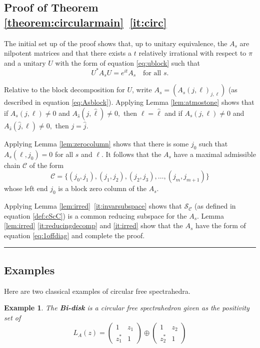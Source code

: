 \documentclass[12pt,makeidx]{amsart}
\renewcommand{\qedsymbol}{\rule[.12ex]{1.2ex}{1.2ex}}
\newtheorem{example}[theorem]{Example}
\def\beq{\begin{equation}}
\def\eeq{\end{equation}}
\numberwithin{equation}{section}
\def\cC{ {\mathcal C} }
\def\cS{{\mathcal S} }
\def\cS{{\mathcal S}}
\begin{document}
\subsection{Proof of Theorem \ref{theorem:circularmain}~\ref{it:circ}}

The initial set up of the proof shows that, up to unitary equivalence, the $A_s$
 are nilpotent matrices and that there exists a $t$ relatively irrational with respect
to $\pi$ and a unitary $U$ with the form of equation \eqref{eq:ublock} such that
\[
U^*A_s U=e^{it} A_s \quad\text{for all $s$.}
\]
 

Relative to the block decomposition for $U$, write $A_s=(A_s (j,\ell)_{j, \ell})$ 
(as described in equation \eqref{eq:Asblock}). Applying Lemma \ref{lem:atmostone} shows that if $A_s (j,\ell) \neq 0$
 and $A_{\hat{s}} (j, \hat{\ell}) \neq 0,$ then $\ell= \hat{\ell}$ and if $A_s (j, \ell) \neq 0$ and $A_{\hat{s}} (\hat{j}, \ell) \neq 0,$ then $j=\hat{j}$.

Applying Lemma \ref{lem:zerocolumn} shows that there is some $j_0$ such that $A_s (\ell, j_0)=0$ for all $s$ and $\ell$. 
It follows that the $A_s$ have a maximal admissible chain $\cC$ of the form 
\[
\cC =  \{(j_0,j_1),(j_1,j_2),(j_2,j_3),\dots, (j_m,j_{m+1}) \}
\]
whose left end $j_0$ is a block zero column of the $A_s$.

Applying Lemma \ref{lem:irred}~\ref{it:invarsubspace} shows that $\cS_{\cC}$ (as defined in
 equation \eqref{def:cScC}) is a common reducing subspace for the $A_s$. Lemma \ref{lem:irred}
\ref{it:reducingdecomp} and \ref{it:irred} show that the $A_s$ have the form of equation 
\eqref{eq:1offdiag} and complete the proof.
\hfill\qedsymbol



\subsection{Examples}
Here are two classical examples of circular free spectrahedra.

\begin{example}\rm
{The \bf Bi-disk} is a circular free spectrahedron  given as the positivity set of 
\beq
 L_A(z)
= 
\begin{pmatrix}
  1& z_1     \\
  z_1^* & 1  
  \end{pmatrix}
  \oplus
  \begin{pmatrix}
  1& z_2     \\
  z_2^* & 1  
  \end{pmatrix}
\eeq

\end{example}
\end{document}
